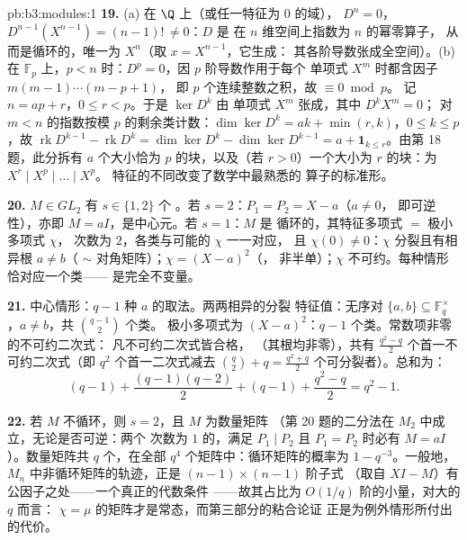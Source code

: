 \begin{solution}{pb:b3:modules:1}
\textbf{19.} (a) 在 $\Q$ 上（或任一特征为 $0$ 的域），
$D^n = 0$，$D^{n-1}(X^{n-1}) = (n-1)!\, \neq 0$：$D$ 是
在 $n$ 维空间上指数为 $n$ 的幂零算子，
从而是循环的，唯一为 $X^n$（取 $x = X^{n-1}$，它生成：
其各阶导数张成全空间）。(b) 在 $\mathbb F_p$ 上，$p
< n$ 时：$D^p = 0$，因 $p$ 阶导数作用于每个
单项式 $X^m$ 时都含因子 $m(m-1)\cdots(m-p+1)$，
即 $p$ 个连续整数之积，故 $\equiv 0 \bmod p$。
记 $n = ap + r$，$0 \leq r < p$。于是 $\ker D^k$ 由
单项式 $X^m$ 张成，其中 $D^kX^m = 0$；
对 $m < n$ 的指数按模 $p$ 的剩余类计数：$\dim\ker D^k = ak + \min(r,
k)$，$0 \leq k \leq p$，故 $\operatorname{rk}D^{k-1} -
\operatorname{rk}D^k = \dim\ker D^k - \dim\ker D^{k-1} = a +
\mathbf 1_{k \leq r}$。由第 18 题，此分拆有 $a$
个大小恰为 $p$ 的块，以及（若 $r > 0$）一个大小为
$r$ 的块：为 $X^r \mid X^p \mid \dots \mid X^p$。
特征的不同改变了数学中最熟悉的
算子的标准形。

\textbf{20.} $M \in GL_2$ 有 $s \in \{1, 2\}$ 个
。若 $s = 2$：$P_1 = P_2 = X - a$（$a \neq 0$，
即可逆性），亦即 $M = aI$，是中心元。若 $s = 1$：$M$ 是
循环的，其特征多项式 $=$ 极小多项式 $\chi$，
次数为 $2$，各类与可能的 $\chi$ 一一对应，
且 $\chi(0) \neq 0$：$\chi$ 分裂且有相异根 $a \neq
b$（ $\sim$ 对角矩阵）；$\chi = (X - a)^2$（，
非半单）；$\chi$ 不可约。每种情形恰对应一个类——
是完全不变量。

\textbf{21.} 中心情形：$q - 1$ 种 $a$ 的取法。两两相异的分裂
特征值：无序对 $\{a, b\} \subseteq
\mathbb F_q^\times$，$a \neq b$，共 $\binom{q-1}2$ 个类。
极小多项式为 $(X-a)^2$：$q - 1$ 个类。常数项非零的不可约二次式：
凡不可约二次式皆合格，
（其根均非零），共有 $\frac{q^2 - q}2$
个首一不可约二次式（即 $q^2$ 个首一二次式减去
$\binom q2 + q = \frac{q^2+q}2$ 个可分裂者）。总和为：
\[
(q - 1) + \frac{(q-1)(q-2)}2 + (q - 1) + \frac{q^2 - q}2
= q^2 - 1 .
\]

\textbf{22.} 若 $M$ 不循环，则 $s = 2$，且 $M$ 为数量矩阵
（第 20 题的二分法在 $M_2$ 中成立，无论是否可逆：两个
次数为 $1$ 的，满足 $P_1 \mid P_2$ 且 $P_1 =
P_2$ 时必有 $M = aI$）。数量矩阵共 $q$ 个，在全部 $q^4$
个矩阵中：循环矩阵的概率为 $1 - q^{-3}$。一般地，
$M_n$ 中非循环矩阵的轨迹，正是 $(n-1)\times(n-1)$ 阶子式
（取自 $XI - M$）有公因子之处——一个真正的代数条件
——故其占比为 $O(1/q)$ 阶的小量，对大的 $q$ 而言：
$\chi = \mu$ 的矩阵才是常态，而第三部分的粘合论证
正是为例外情形所付出的代价。


\end{solution}
